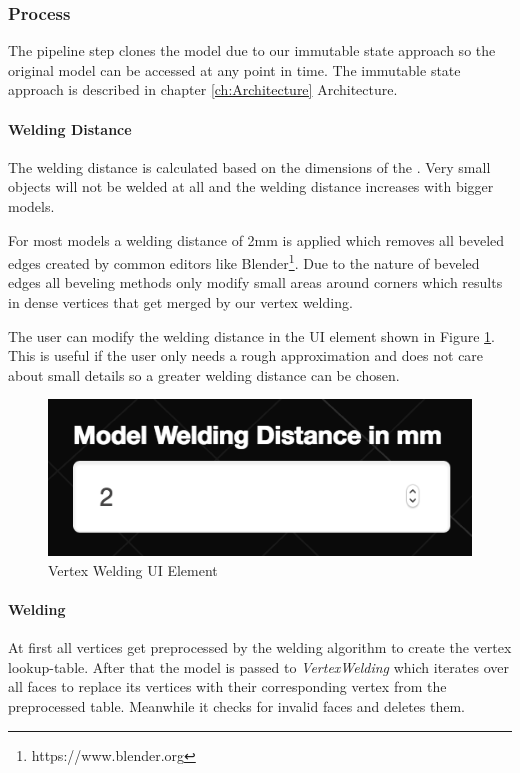 \documentclass[../ClassicThesis.tex]{subfiles}
\begin{document}
\subsubsection{Process}

The pipeline step clones the model due to our immutable state approach so the original model can be accessed at any point in time. The immutable state approach is described in chapter \ref{ch:Architecture} Architecture.


\paragraph{Welding Distance}

The welding distance is calculated based on the dimensions of the {\threedmodel}. Very small objects will not be welded at all and the welding distance increases with bigger models.

For most models a welding distance of 2mm is applied which removes all beveled edges created by common editors like Blender\footnote{https://www.blender.org}. Due to the nature of beveled edges all beveling methods only modify small areas around corners which results in dense vertices that get merged by our vertex welding.

The user can modify the welding distance in the UI element shown in Figure \ref{fig:weldingUI}. This is useful if the user only needs a rough approximation and does not care about small details so a greater welding distance can be chosen.

\begin{figure}
\includegraphics[width=0.5\columnwidth]{Images/04-approx-weldingUI.png}
\caption{Vertex Welding UI Element}
\label{fig:weldingUI}
\end{figure}



\paragraph{Welding}

At first all vertices get preprocessed by the welding algorithm to create the vertex lookup-table. After that the model is passed to \emph{VertexWelding} which iterates over all faces to replace its vertices with their corresponding vertex from the preprocessed table. Meanwhile it checks for invalid faces and deletes them.
\end{document}
